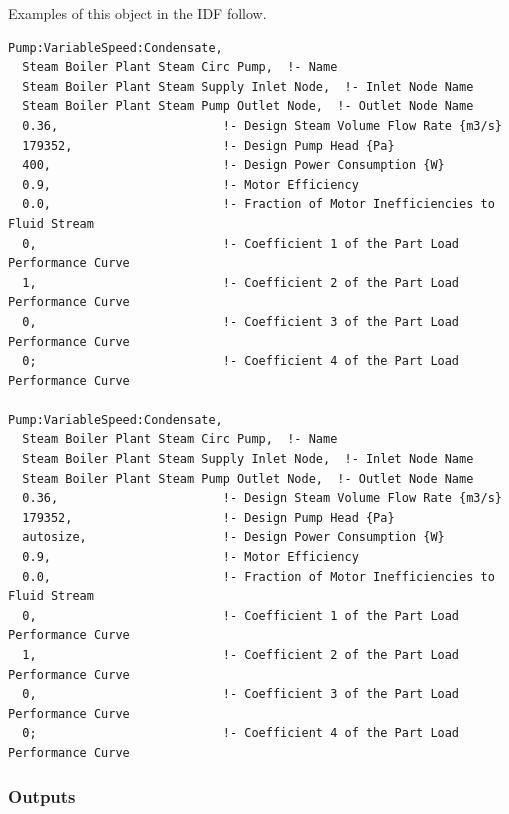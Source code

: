 Examples of this object in the IDF follow.

\begin{lstlisting}
Pump:VariableSpeed:Condensate,
  Steam Boiler Plant Steam Circ Pump,  !- Name
  Steam Boiler Plant Steam Supply Inlet Node,  !- Inlet Node Name
  Steam Boiler Plant Steam Pump Outlet Node,  !- Outlet Node Name
  0.36,                       !- Design Steam Volume Flow Rate {m3/s}
  179352,                     !- Design Pump Head {Pa}
  400,                        !- Design Power Consumption {W}
  0.9,                        !- Motor Efficiency
  0.0,                        !- Fraction of Motor Inefficiencies to Fluid Stream
  0,                          !- Coefficient 1 of the Part Load Performance Curve
  1,                          !- Coefficient 2 of the Part Load Performance Curve
  0,                          !- Coefficient 3 of the Part Load Performance Curve
  0;                          !- Coefficient 4 of the Part Load Performance Curve

Pump:VariableSpeed:Condensate,
  Steam Boiler Plant Steam Circ Pump,  !- Name
  Steam Boiler Plant Steam Supply Inlet Node,  !- Inlet Node Name
  Steam Boiler Plant Steam Pump Outlet Node,  !- Outlet Node Name
  0.36,                       !- Design Steam Volume Flow Rate {m3/s}
  179352,                     !- Design Pump Head {Pa}
  autosize,                   !- Design Power Consumption {W}
  0.9,                        !- Motor Efficiency
  0.0,                        !- Fraction of Motor Inefficiencies to Fluid Stream
  0,                          !- Coefficient 1 of the Part Load Performance Curve
  1,                          !- Coefficient 2 of the Part Load Performance Curve
  0,                          !- Coefficient 3 of the Part Load Performance Curve
  0;                          !- Coefficient 4 of the Part Load Performance Curve
\end{lstlisting}

\subsubsection{Outputs}\label{outputs-2-016}

